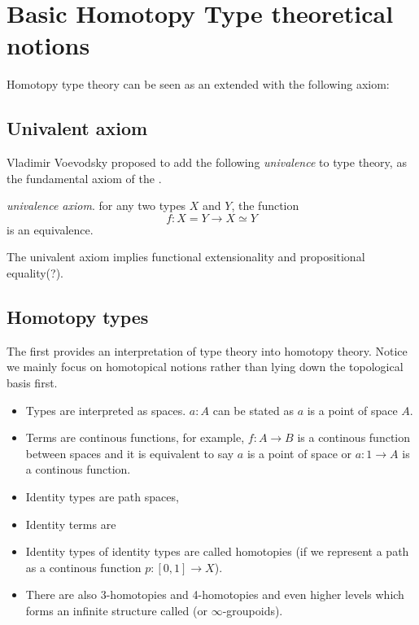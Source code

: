 \section{Basic Homotopy Type theoretical notions}

Homotopy type theory can be seen as an \itt extended with the
following axiom:

\subsection{Univalent axiom}

Vladimir Voevodsky proposed to add the following \emph{univalence} to
type theory, as the fundamental axiom of the \hott.
 
\begin{definition}
\emph{univalence axiom}. for any two types $X$ and $Y$, the function 
$$f : X = Y \rightarrow X \simeq Y$$ is an equivalence.
\end{definition}


The univalent axiom implies functional extensionality and
propositional equality(?).

\subsection{Homotopy types}

The \hott first provides an interpretation of type theory into
homotopy theory. Notice we mainly focus on homotopical notions rather
than lying down the topological basis first.

\begin{itemize}
\item Types are interpreted as spaces. $a : A$ can be stated as $a$ is
  a point of space $A$.
\item Terms are continous functions, for example, $f : A \rightarrow B$ is a
  continous function between spaces and it is equivalent to say $a$ is
  a point of space or $a : 1 \rightarrow A$ is a continous function.
\item Identity types are path spaces, 
\item Identity terms are 
\item Identity types of identity types are called homotopies (if we
  represent a path as a continous function $p : [0,1] \rightarrow X$).
\item There are also 3-homotopies and 4-homotopies and even higher
  levels which forms an infinite structure called  \og (or $\infty$-groupoids).
\end{itemize}

